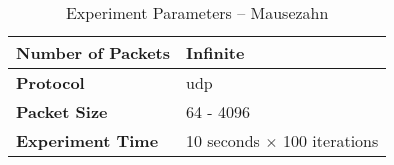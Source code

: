 \begin{table}[ht!]
    \small
    \caption{Experiment Parameters -- Mausezahn}
    \label{mausezahnparam}
    \begin{adjustbox}{center}
        \renewcommand*\arraystretch{1.2}\begin{tabular}{| L{3.5cm} || L{4.5cm} |}
            \hline
            \textbf{Number of Packets} & Infinite
            \\ \hline
            \textbf{Protocol} & \gls{udp}
            \\ \hline
            \textbf{Packet Size} & 64 - 4096
            \\ \hline
            \textbf{Experiment Time} & 10 seconds $\times$ 100 iterations
            \\ \hline
        \end{tabular}
    \end{adjustbox}
\end{table}
